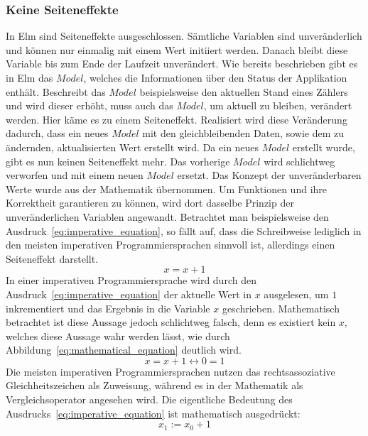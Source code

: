\subsubsection{Keine Seiteneffekte}
\label{sec:Keine Seiteneffekte}
In Elm sind Seiteneffekte ausgeschlossen. Sämtliche Variablen sind unveränderlich und können nur einmalig mit einem Wert initiiert werden. Danach bleibt diese Variable bis zum Ende der Laufzeit unverändert. Wie bereits beschrieben gibt es in Elm das $Model$, welches die Informationen über den Status der Applikation enthält. Beschreibt das $Model$ beispielsweise den aktuellen Stand eines Zählers und wird dieser erhöht, muss auch das $Model$, um aktuell zu bleiben, verändert werden. Hier käme es zu einem Seiteneffekt. Realisiert wird diese Veränderung dadurch, dass ein neues $Model$ mit den gleichbleibenden Daten, sowie dem zu ändernden, aktualisierten Wert erstellt wird. Da ein neues $Model$ erstellt wurde, gibt es nun keinen Seiteneffekt mehr. Das vorherige $Model$ wird schlichtweg verworfen und mit einem neuen $Model$ ersetzt.
Das Konzept der unveränderbaren Werte wurde aus der Mathematik übernommen.  Um Funktionen und ihre Korrektheit garantieren zu können, wird dort dasselbe Prinzip der unveränderlichen Variablen angewandt. Betrachtet man beispielsweise den Ausdruck~\ref{eq:imperative_equation}, so fällt auf, dass die Schreibweise lediglich in den meisten imperativen Programmiersprachen sinnvoll ist, allerdings einen Seiteneffekt darstellt.
\begin{equation} \label{eq:imperative_equation}
x = x + 1
\end{equation}
In einer imperativen Programmiersprache wird durch den Ausdruck~\ref{eq:imperative_equation} der aktuelle Wert in $x$ ausgelesen, um $1$ inkrementiert und das Ergebnis in die Variable $x$ geschrieben.
Mathematisch betrachtet ist diese Aussage jedoch schlichtweg falsch, denn es existiert kein $x$, welches diese Aussage wahr werden lässt, wie durch Abbildung~\ref{eq:mathematical_equation} deutlich wird.
\begin{equation} \label{eq:mathematical_equation}
x=x+1 \leftrightarrow 0=1
\end{equation}
Die meisten imperativen Programmiersprachen nutzen das rechtsassoziative Gleichheitszeichen als Zuweisung, während es in der Mathematik als Vergleichsoperator angesehen wird.
Die eigentliche Bedeutung des Ausdrucks~\ref{eq:imperative_equation} ist mathematisch ausgedrückt:
\begin{equation} \label{eq:true_equation}
x_1:= x_0 + 1
\end{equation}

